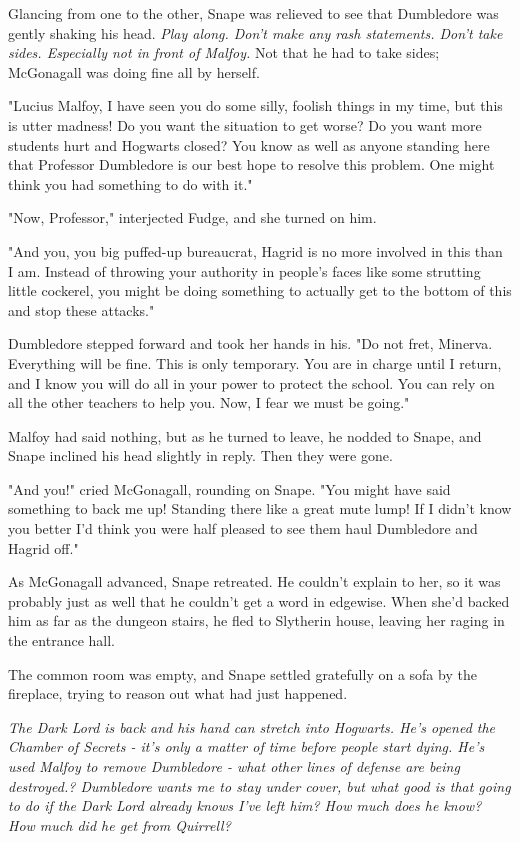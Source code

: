\documentclass[a4paper,11pt]{article}
\begin{document}
Glancing from one to the other, Snape was relieved to see that Dumbledore was gently shaking his head. \emph{Play along. Don't make any rash statements. Don't take sides. Especially not in front of Malfoy.} Not that he had to take sides; McGonagall was doing fine all by herself.

"Lucius Malfoy, I have seen you do some silly, foolish things in my time, but this is utter madness! Do you want the situation to get worse? Do you want more students hurt and Hogwarts closed? You know as well as anyone standing here that Professor Dumbledore is our best hope to resolve this problem. One might think you had something to do with it."

"Now, Professor," interjected Fudge, and she turned on him.

"And you, you big puffed-up bureaucrat, Hagrid is no more involved in this than I am. Instead of throwing your authority in people's faces like some strutting little cockerel, you might be doing something to actually get to the bottom of this and stop these attacks."

Dumbledore stepped forward and took her hands in his. "Do not fret, Minerva. Everything will be fine. This is only temporary. You are in charge until I return, and I know you will do all in your power to protect the school. You can rely on all the other teachers to help you. Now, I fear we must be going."

Malfoy had said nothing, but as he turned to leave, he nodded to Snape, and Snape inclined his head slightly in reply. Then they were gone.

"And you!" cried McGonagall, rounding on Snape. "You might have said something to back me up! Standing there like a great mute lump! If I didn't know you better I'd think you were half pleased to see them haul Dumbledore and Hagrid off."

As McGonagall advanced, Snape retreated. He couldn't explain to her, so it was probably just as well that he couldn't get a word in edgewise. When she'd backed him as far as the dungeon stairs, he fled to Slytherin house, leaving her raging in the entrance hall.

The common room was empty, and Snape settled gratefully on a sofa by the fireplace, trying to reason out what had just happened.

\emph{The Dark Lord is back and his hand can stretch into Hogwarts. He's opened the Chamber of Secrets - it's only a matter of time before people start dying. He's used Malfoy to remove Dumbledore - what other lines of defense are being destroyed.? Dumbledore wants me to stay under cover, but what good is that going to do if the Dark Lord already knows I've left him? How much does he know? How much did he get from Quirrell?}
\end{document}
